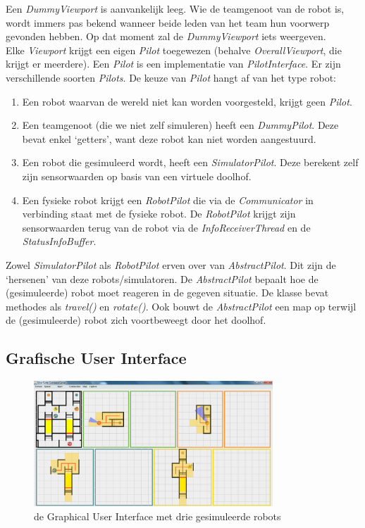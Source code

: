 \documentclass[tt3]{penoverslag}
\begin{document}
Een \textit{DummyViewport} is aanvankelijk leeg. Wie de teamgenoot van de robot is, wordt immers pas bekend wanneer beide leden van het team hun voorwerp gevonden hebben. Op dat moment zal de \textit{DummyViewport} iets weergeven.\\

Elke \textit{Viewport} krijgt een eigen \textit{Pilot} toegewezen (behalve \textit{OverallViewport}, die krijgt er meerdere). Een \textit{Pilot} is een implementatie van \textit{PilotInterface}. Er zijn verschillende soorten \textit{Pilots}. De keuze van \textit{Pilot} hangt af van het type robot:

\begin{enumerate}
	\item Een robot waarvan de wereld niet kan worden voorgesteld, krijgt geen \textit{Pilot}.
	\item Een teamgenoot (die we niet zelf simuleren) heeft een \textit{DummyPilot}. Deze bevat enkel `getters', want deze robot kan niet worden aangestuurd.
	\item Een robot die gesimuleerd wordt, heeft een \textit{SimulatorPilot}. Deze berekent zelf zijn sensorwaarden op basis van een virtuele doolhof.
	\item Een fysieke robot krijgt een \textit{RobotPilot} die via de \textit{Communicator} in verbinding staat met de fysieke robot. De \textit{RobotPilot} krijgt zijn sensorwaarden terug van de robot via de \textit{InfoReceiverThread} en de \textit{StatusInfoBuffer}.
\end{enumerate}

 Zowel \textit{SimulatorPilot} als \textit{RobotPilot} erven over van \textit{AbstractPilot}. Dit zijn de `hersenen' van deze robots/simulatoren. De \textit{AbstractPilot} bepaalt hoe de (gesimuleerde) robot moet reageren in de gegeven situatie. De klasse bevat methodes als \textit{travel()} en \textit{rotate()}. Ook bouwt de \textit{AbstractPilot} een map op terwijl de (gesimuleerde) robot zich voortbeweegt door het doolhof.

\subsection{Grafische User Interface}
\label{ssec:GUI}

\begin{figure}[h]
\centering
	\includegraphics[width=0.8\textwidth]{gui}
\caption{de Graphical User Interface met drie gesimuleerde robots}
\label{fig:GUI1}
\end{figure}
\end{document}
